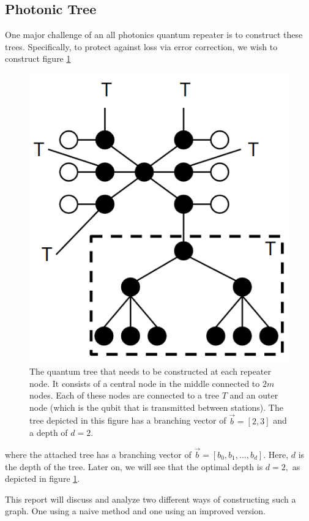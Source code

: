\documentclass[%
 reprint,
 amsmath,amssymb
 aps,
]{revtex4}
\theoremstyle{remark}
\begin{document}
\subsection{Photonic Tree}
One major challenge of an all photonics quantum repeater is to construct these trees. Specifically, to protect against loss via error correction, we wish to construct figure \ref{fig:cluster}
\begin{figure}[h!]
    \centering
    \includegraphics[width=0.25\linewidth]{figs/cluster.png}
    \caption{The quantum tree that needs to be constructed at each repeater node. It consists of a central node in the middle connected to $2m$ nodes. Each of these nodes are connected to a tree $T$ and an outer node (which is the qubit that is transmitted between stations). The tree depicted in this figure has a branching vector of $\vec{b}=[2,3]$ and a depth of $d=2.$}
    \label{fig:cluster}
\end{figure}
where the attached tree has a branching vector of $\vec{b}=[b_0, b_1, \dots, b_d].$ Here, $d$ is the depth of the tree. Later on, we will see that the optimal depth is $d=2,$ as depicted in figure \ref{fig:cluster}. 

This report will discuss and analyze two different ways of constructing such a graph. One using a naive method and one using an improved version.
\end{document}
